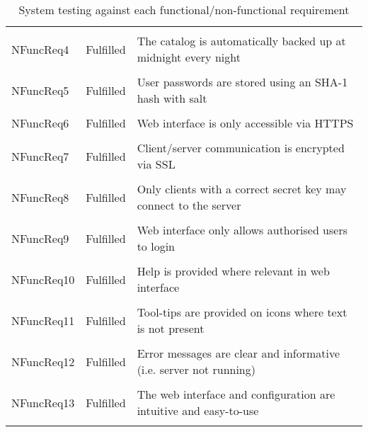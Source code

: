 \begin{longtable}{ l l p{5cm} }
    \\ \\
    NFuncReq4           & Fulfilled                 & The catalog is
                                                      automatically backed up
                                                      at midnight every night
    \\ \\
    NFuncReq5           & Fulfilled                 & User passwords are stored
                                                      using an SHA-1 hash with
                                                      salt
    \\ \\
    NFuncReq6           & Fulfilled                 & Web interface is only
                                                      accessible via HTTPS
    \\ \\
    NFuncReq7           & Fulfilled                 & Client/server
                                                      communication is
                                                      encrypted via SSL
    \\ \\
    NFuncReq8           & Fulfilled                 & Only clients with
                                                      a correct secret key may
                                                      connect to the server
    \\ \\
    NFuncReq9           & Fulfilled                 & Web interface only allows
                                                      authorised users to login
    \\ \\
    NFuncReq10          & Fulfilled                 & Help is provided where
                                                      relevant in web interface
    \\ \\
    NFuncReq11          & Fulfilled                 & Tool-tips are provided on
                                                      icons where text is not
                                                      present
    \\ \\
    NFuncReq12          & Fulfilled                 & Error messages are clear
                                                      and informative (i.e.
                                                      server not running)
    \\ \\
    NFuncReq13          & Fulfilled                 & The web interface and
                                                      configuration are
                                                      intuitive and easy-to-use
    \\ \bottomrule
\caption{System testing against each functional/non-functional requirement}
\label{tab:system-testing}
\end{longtable}
